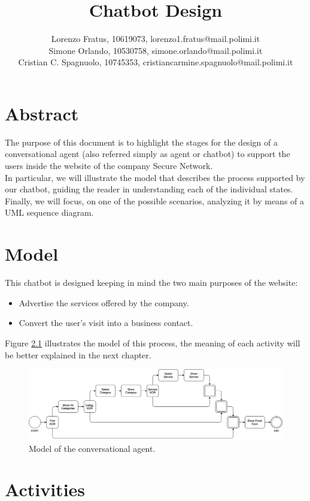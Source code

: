 \documentclass[12pt]{report}
\title{Chatbot Design}
\author{Lorenzo Fratus, 10619073, lorenzo1.fratus@mail.polimi.it \\
Simone Orlando, 10530758, simone.orlando@mail.polimi.it \\
Cristian C. Spagnuolo, 10745353, cristiancarmine.spagnuolo@mail.polimi.it}
\begin{document}
\maketitle
\tableofcontents

\chapter{Abstract}
The purpose of this document is to highlight the stages for the 
design of a conversational agent (also referred simply as agent or chatbot) to support 
the users inside the website of the company Secure Network.\\
In particular, we will illustrate the model that describes the process
supported by our chatbot, guiding the reader in understanding each of
the individual states.\\
Finally, we will focus, on one of the possible scenarios, analyzing
it by means of a UML sequence diagram.

\chapter{Model}
This chatbot is designed keeping in mind the two main purposes of the
website:
\begin{itemize}
	\item Advertise the services offered by the company.
	\item Convert the user's visit into a business contact. 
\end{itemize}
\noindent
Figure \ref{fig:model} illustrates the model of this process, the 
meaning of each activity will be better explained in the next chapter.

\begin{figure}[h]
	\centering
	\includegraphics[width=\textwidth]{model}
	\caption{Model of the conversational agent.}
	\label{fig:model}
\end{figure}

\chapter{Activities}
\end{document}
